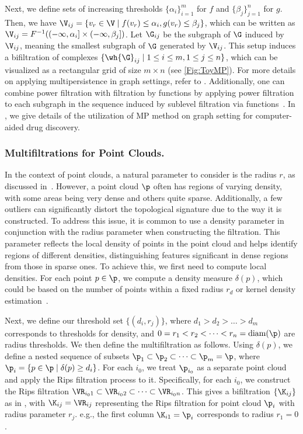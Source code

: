Next, we define sets of increasing thresholds $\{\alpha_i\}_{i=1}^m$ for $f$ and $\{\beta_j\}_{j=1}^n$ for $g$. Then, we have $\V_{ij} = \{v_r \in \V \mid f(v_r) \leq \alpha_i, g(v_r) \leq \beta_j\}$, which can be written as $\V_{ij} = F^{-1}((-\infty, \alpha_i] \times (-\infty, \beta_j])$. Let $\G_{ij}$ be the subgraph of $\G$ induced by $\V_{ij}$, meaning the smallest subgraph of $\G$ generated by $\V_{ij}$. This setup induces a bifiltration of complexes $\{\wh{\G}_{ij} \mid 1 \leq i \leq m, 1 \leq j \leq n\}$, which can be visualized as a rectangular grid of size $m \times n$ (see \cref{Fig:ToyMP}). For more details on applying multipersistence in graph settings, refer to \cite{chen2024emp, loiseaux2024stable}. Additionally, one can combine power filtration with filtration by functions by applying power filtration to each subgraph in the sequence induced by sublevel filtration via functions~\cite{demir2022todd}. In , we give details of the utilization of MP method on graph setting for computer-aided drug discovery.



\subsubsection{Multifiltrations for Point Clouds.} \label{sec:MP-point_cloud}

In the context of point clouds, a natural parameter to consider is the radius $r$, as discussed in~. However, a point cloud $\p$ often has regions of varying density, with some areas being very dense and others quite sparse. Additionally, a few outliers can significantly distort the topological signature due to the way it is constructed. To address this issue, it is common to use a density parameter in conjunction with the radius parameter when constructing the filtration. This parameter reflects the local density of points in the point cloud and helps identify regions of different densities, distinguishing features significant in dense regions from those in sparse ones.
To achieve this, we first need to compute local densities. For each point $p \in \p$, we compute a density measure $\delta(p)$, which could be based on the number of points within a fixed radius $r_d$ or kernel density estimation~\cite{vipond2020multiparameter,botnan2022introduction}.
 

Next, we define our threshold set $\{(d_i, r_j)\}$, where $d_1 > d_2 > \dots > d_m$ corresponds to thresholds for density, and $0 = r_1 < r_2 < \dots < r_n = \text{diam}(\p)$ are radius thresholds. We then define the multifiltration as follows. Using $\delta(p)$, we define a nested sequence of subsets $\p_1 \subset \p_2 \subset \dots \subset \p_m = \p$, where $\p_i = \{p \in \p \mid \delta(p) \geq d_i\}$. For each $i_0$, we treat $\p_{i_0}$ as a separate point cloud and apply the Rips filtration process to it. Specifically, for each $i_0$, we construct the Rips filtration $\VR_{i_01} \subset \VR_{i_02} \subset \dots \subset \VR_{i_0n}$. This gives a bifiltration $\{\K_{ij}\}$ as in , with $\K_{ij} = \VR_{ij}$ representing the Rips filtration for point cloud $\p_i$ with radius parameter $r_j$. e.g., the first column $\K_{i1} = \p_i$ corresponds to radius $r_1 = 0$.

